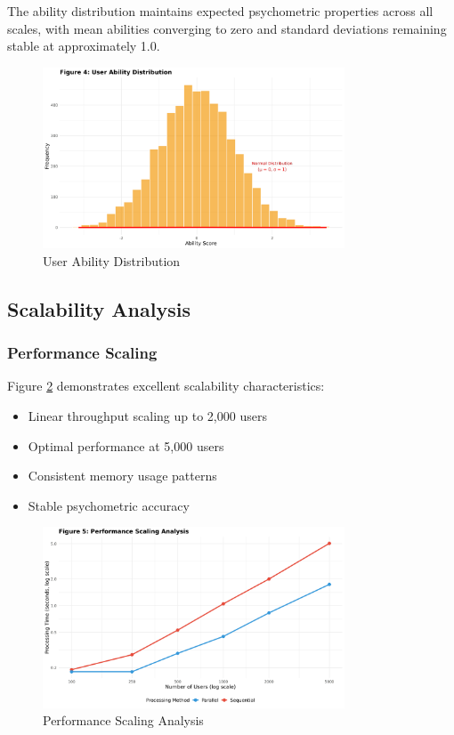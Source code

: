 \documentclass[11pt]{article}
\begin{document}
The ability distribution maintains expected psychometric properties across all scales, with mean abilities converging to zero and standard deviations remaining stable at approximately 1.0.

\begin{figure}[H]
\centering
\includegraphics[width=0.8\textwidth]{Figure4_Ability_Distribution.png}
\caption{User Ability Distribution}
\label{fig:ability}
\end{figure}

\subsection{Scalability Analysis}

\subsubsection{Performance Scaling}

Figure \ref{fig:scaling} demonstrates excellent scalability characteristics:
\begin{itemize}
\item Linear throughput scaling up to 2,000 users
\item Optimal performance at 5,000 users
\item Consistent memory usage patterns
\item Stable psychometric accuracy
\end{itemize}

\begin{figure}[H]
\centering
\includegraphics[width=0.8\textwidth]{Figure5_Performance_Scaling.png}
\caption{Performance Scaling Analysis}
\label{fig:scaling}
\end{figure}
\end{document}
